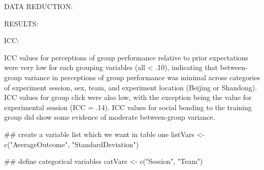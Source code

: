 DATA REDUCTION:









RESULTS:

ICC:







ICC values for perceptions of group performance relative to prior expectations were very low for each grouping variables (all < .10), indicating that between-group variance in perceptions of group performance was minimal across categories of experiment session, sex, team, and experiment location (Beijing or Shandong).  ICC values for group click were also low, with the exception being the value for experimental session (ICC = .14).
ICC values for social bonding to the training group did show some evidence of moderate between-group variance.  

  ## create a variable list which we want in table one
  listVars <- c("AverageOutcome", "StandardDeviation")

  ## define categorical variables
  catVars <- c("Session", "Team")


